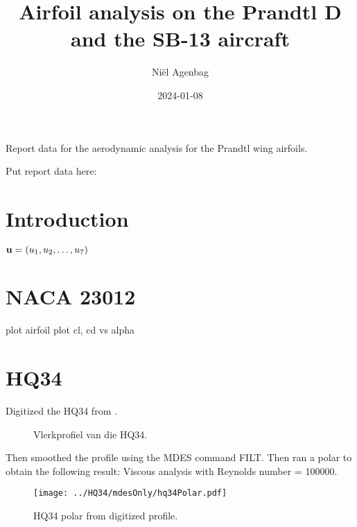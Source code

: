 \documentclass{article}
\title{Airfoil analysis on the Prandtl D and the SB-13 aircraft}
\author{Ni\"el Agenbag}
\date{2024-01-08}
\begin{document}
\maketitle

Report data for the aerodynamic analysis for the Prandtl wing airfoils.

Put report data here:

\section{Introduction}




$\mathbf u=(u_1,u_2,\ldots,u_{7})$


\section{NACA 23012}

plot airfoil
plot cl, cd vs alpha

\section{HQ34}

Digitized the HQ34 from .


\begin{figure}[H]
	\begin{center}
	\end{center}
	\caption{Vlerkprofiel van die HQ34.}
	\label{Fig: Vlerkprofiel HQ34}
\end{figure}


Then smoothed the profile using the MDES command FILT.
Then ran a polar to obtain the following result:
Viscous analysis with Reynolds number = 100000.

\begin{figure}[H]
\centering
\texttt{[image: ../HQ34/mdesOnly/hq34Polar.pdf]}
\caption{HQ34 polar from digitized profile.}
\end{figure}



\end{document}
